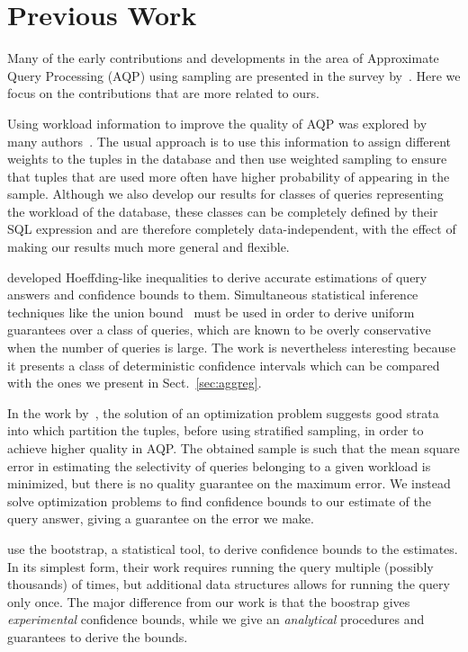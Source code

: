 \section{Previous Work}\label{sec:prevwork}
Many of the early contributions and developments in the area of Approximate
Query Processing (AQP) using sampling are presented in the survey by~\citet{Das09}. Here we focus on the contributions that are more related to
ours.

Using workload information to improve the quality of AQP was explored by many
authors~\citep{KonigW99,GantiLR00,ChaudhuriDDMN01,LazaradisM01,ChaudhuriDN07}. The
usual approach is to use this information to assign different weights to the
tuples in the database and then use weighted sampling to ensure that tuples that
are used more often have higher probability of appearing in the sample. Although
we also develop our results for classes of queries representing the workload of
the database, these classes can be completely defined by their SQL expression
and are therefore completely data-independent, with the effect of making our
results much more general and flexible.

\citet{Haas96,Haas97} developed Hoeffding-like inequalities to derive
accurate estimations of query answers and confidence bounds to them.
Simultaneous statistical inference techniques like the union
bound~\citep{Miller81} must be used in order to derive uniform guarantees over a
class of queries, which are known to be overly conservative when the number of
queries is large.  The work is nevertheless interesting because it presents a
class of deterministic confidence intervals which can be compared with the ones
we present in Sect.~\ref{sec:aggreg}.

In the work by~\citet{ChaudhuriDN07}, the solution of an
optimization problem suggests good strata into which partition the tuples,
before using stratified sampling, in order to achieve higher quality in AQP.
The obtained sample is such that the mean square error in estimating the
selectivity of queries belonging to a given workload is minimized, but there is
no quality guarantee on the maximum error. We instead solve optimization
problems to find confidence bounds to our estimate of the query answer, giving a
guarantee on the error we make.

\citet{PolJ05} use the bootstrap, a statistical tool, to derive
confidence bounds to the estimates. In its simplest form, their work requires
running the query multiple (possibly thousands) of times, but additional data
structures allows for running the query only once. The major difference from our
work is that the boostrap gives \emph{experimental} confidence bounds, while we
give an \emph{analytical} procedures and guarantees to derive the bounds.

